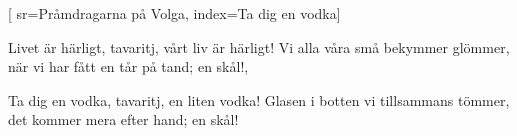 [ 							
	sr={Pråmdragarna på Volga},
	index={Ta dig en vodka}]		
	
\beginverse*						
Livet är härligt,
tavaritj, vårt liv är härligt!
Vi alla våra små bekymmer glömmer, 
när vi har fått en tår på tand; en skål!,
\endverse						

\beginverse				
Ta dig en vodka, 
tavaritj, en liten vodka! 
Glasen i botten vi tillsammans tömmer,
det kommer mera efter hand; en skål!
\endverse				
\endsong		
